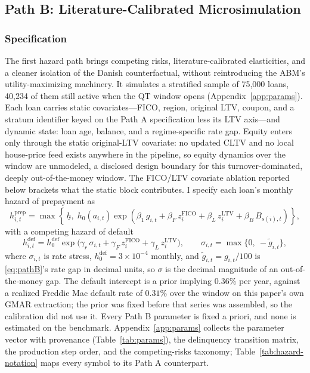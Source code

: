\subsection{Path B: Literature-Calibrated Microsimulation}\label{sec:pathb}

\subsubsection{Specification}

The first hazard path brings competing risks, literature-calibrated elasticities, and a cleaner isolation of the Danish counterfactual, without reintroducing the ABM's utility-maximizing machinery. It simulates a stratified sample of 75,000 loans, 40,234 of them still active when the QT window opens (Appendix~\ref{app:params}). Each loan carries static covariates---FICO, region, original LTV, coupon, and a stratum identifier keyed on the Path A specification less its LTV axis---and dynamic state: loan age, balance, and a regime-specific rate gap. Equity enters only through the static original-LTV covariate: no updated CLTV and no local house-price feed exists anywhere in the pipeline, so equity dynamics over the window are unmodeled, a disclosed design boundary for this turnover-dominated, deeply out-of-the-money window. The FICO/LTV covariate ablation reported below brackets what the static block contributes. I specify each loan's monthly hazard of prepayment as
\begin{equation}\label{eq:pathB}
h^{\mathrm{prep}}_{i,t} = \max\!\left\{\, \underline{h},\; h_0\!\left(a_{i,t}\right) \exp\!\left( \beta_1\, g_{i,t} + \beta_F\, z^{\mathrm{FICO}}_{i} + \beta_L\, z^{\mathrm{LTV}}_{i} + \beta_B\, B_{s(i),t} \right) \right\},
\end{equation}
with a competing hazard of default
\begin{equation}\label{eq:default}
h^{\mathrm{def}}_{i,t} = h^{\mathrm{def}}_0 \exp\!\big( \gamma_r\, \sigma_{i,t} + \gamma_F\, z^{\mathrm{FICO}}_{i} + \gamma_L\, z^{\mathrm{LTV}}_{i} \big), \qquad \sigma_{i,t} = \max\{0,\ -\tilde g_{i,t}\},
\end{equation}
where $\sigma_{i,t}$ is rate stress, $h^{\mathrm{def}}_0 = 3\times10^{-4}$ monthly, and $\tilde g_{i,t} = g_{i,t}/100$ is \eqref{eq:pathB}'s rate gap in decimal units, so $\sigma$ is the decimal magnitude of an out-of-the-money gap. The default intercept is a prior implying $0.36\%$ per year, against a realized Freddie Mac default rate of $0.31\%$ over the window on this paper's own GMAR extraction; the prior was fixed before that series was assembled, so the calibration did not use it. Every Path B parameter is fixed a priori, and none is estimated on the benchmark. Appendix~\ref{app:params} collects the parameter vector with provenance (Table~\ref{tab:params}), the delinquency transition matrix, the production step order, and the competing-risks taxonomy; Table~\ref{tab:hazard-notation} maps every symbol to its Path A counterpart.

